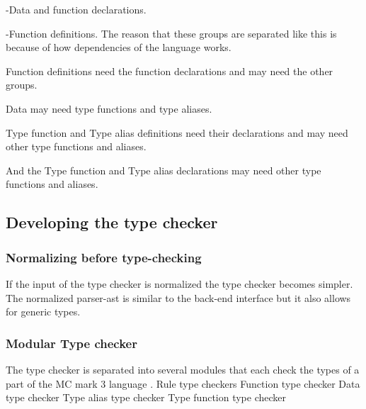 -Data and function declarations.

-Function definitions.
\linebreak
The reason that these groups are separated like this is because of how dependencies of the language works.

Function definitions need the function declarations and may need the other groups.

Data may need type functions and type aliases.

Type function and Type alias definitions need their declarations and may need other type functions and aliases.

And the Type function and Type alias declarations may need other type functions and aliases.




\subsection{Developing the type checker}

\subsubsection{Normalizing before type-checking}
If the input of the type checker is normalized the type checker becomes simpler.
The normalized parser-ast is similar to the back-end interface but it also allows for generic types.


\subsubsection{Modular Type checker}
The type checker is separated into several modules that each check the types of a part of the MC mark 3 language .
	Rule type checkers
	Function type checker
	Data type checker
	Type alias type checker
	Type function type checker



